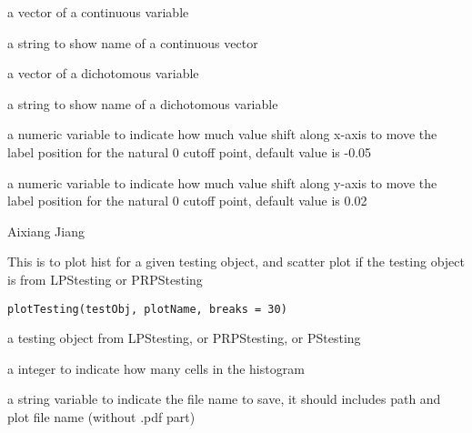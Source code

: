 \documentclass[letterpaper]{book}
\begin{document}
%
\begin{Arguments}
\begin{ldescription}
\item[\code{contdat}] a vector of a continuous variable

\item[\code{contname}] a string to show name of a continuous vector

\item[\code{catdat}] a vector of a dichotomous variable

\item[\code{catname}] a string to show name of a  dichotomous variable

\item[\code{xshift}] a numeric variable to indicate how much value shift along x-axis to move the label position for the natural 0 cutoff point,
default value is -0.05

\item[\code{yshift}] a numeric variable to indicate how much value shift along y-axis to move the label position for the natural 0 cutoff point,
default value is 0.02
\end{ldescription}
\end{Arguments}
%
\begin{Author}\relax
Aixiang Jiang
\end{Author}
%
\begin{Description}\relax
This is to plot hist for a given testing object, and scatter plot if the testing object is from LPStesting or PRPStesting
\end{Description}
%
\begin{Usage}
\begin{verbatim}
plotTesting(testObj, plotName, breaks = 30)
\end{verbatim}
\end{Usage}
%
\begin{Arguments}
\begin{ldescription}
\item[\code{testObj}] a testing object from LPStesting, or PRPStesting, or PStesting

\item[\code{breaks}] a integer to indicate how many cells in the histogram

\item[\code{plotNanme}] a string variable to indicate the file name to save, it should includes path and plot file name (without .pdf part)
\end{ldescription}
\end{Arguments}
\end{document}
